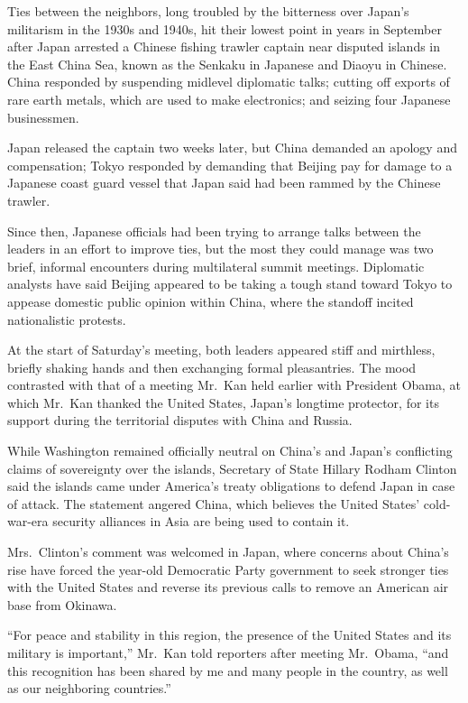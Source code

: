 ﻿\documentclass[12pt]{article}
\begin{document}
Ties between the neighbors, long troubled by the bitterness over Japan's militarism in the 1930s and
1940s, hit their lowest point in years in September after Japan arrested a Chinese fishing trawler
captain near disputed islands in the East China Sea, known as the Senkaku in Japanese and Diaoyu in
Chinese. China responded by suspending midlevel diplomatic talks; cutting off exports of rare earth
metals, which are used to make electronics; and seizing four Japanese businessmen.

Japan released the captain two weeks later, but China demanded an apology and compensation; Tokyo
responded by demanding that Beijing pay for damage to a Japanese coast guard vessel that Japan said
had been rammed by the Chinese trawler.

Since then, Japanese officials had been trying to arrange talks between the leaders in an effort to
improve ties, but the most they could manage was two brief, informal encounters during multilateral
summit meetings. Diplomatic analysts have said Beijing appeared to be taking a tough stand toward
Tokyo to appease domestic public opinion within China, where the standoff incited nationalistic
protests.

At the start of Saturday's meeting, both leaders appeared stiff and mirthless, briefly shaking hands
and then exchanging formal pleasantries. The mood contrasted with that of a meeting Mr.~Kan held
earlier with President Obama, at which Mr.~Kan thanked the United States, Japan's longtime
protector, for its support during the territorial disputes with China and Russia.

While Washington remained officially neutral on China's and Japan's conflicting claims of
sovereignty over the islands, Secretary of State Hillary Rodham Clinton said the islands came under
America's treaty obligations to defend Japan in case of attack. The statement angered China, which
believes the United States' cold-war-era security alliances in Asia are being used to contain it.

Mrs.~Clinton's comment was welcomed in Japan, where concerns about China's rise have forced the
year-old Democratic Party government to seek stronger ties with the United States and reverse its
previous calls to remove an American air base from Okinawa.

``For peace and stability in this region, the presence of the United States and its military is
important,'' Mr.~Kan told reporters after meeting Mr.~Obama, ``and this recognition has been shared
by me and many people in the country, as well as our neighboring countries.''
\end{document}
